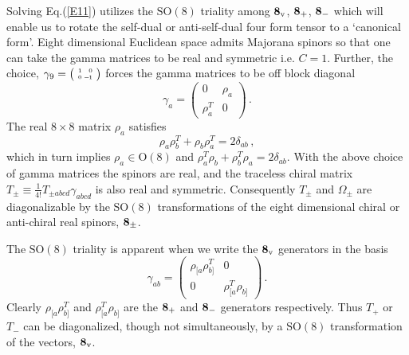 \documentclass[a4paper,11pt]{article}
\begin{document}
Solving Eq.(\ref{E11}) utilizes    the $\mbox{SO}(8)$ triality among   ${\bf 8}_{{\rm v}}$, ${\bf 8}_{+}$, ${\bf 8}_{-}$ which will enable us to
rotate the self-dual or anti-self-dual four form tensor to a `canonical form'.  Eight dimensional Euclidean space admits Majorana spinors so that one
can take the  gamma matrices to be real and symmetric i.e. $C=1$. Further, the choice, $\gamma_{9}={\big(\!{\tiny\begin{array}{l}
1\,\,\,\,\,0\\0-\!\!1\end{array}}\!\big)}$ forces the gamma matrices to be off block diagonal
\begin{equation}
\gamma_{a}=\left(\begin{array}{cc}0&\rho_{a}\\\rho_{a}^{T}&0\end{array}\right)\,.
\end{equation}
The real $8\times 8$ matrix $\rho_{a}$ satisfies
\begin{equation}
\rho_{a}\rho_{b}^{T}+\rho_{b}\rho_{a}^{T}=2\delta_{ab}\,,
\end{equation}
which in turn implies $\rho_{a}\!\in\!\mbox{O}(8)$ and  $\rho_{a}^{T}\rho_{b}+\rho_{b}^{T}\rho_{a}=2\delta_{ab}$. With the above choice of gamma
matrices the spinors are real, and  the traceless chiral matrix $T_{\pm}\equiv\frac{1}{4!}T_{\pm abcd}\gamma_{abcd}$  is   also real and symmetric.
Consequently $T_{\pm}$ and  $\Omega_{\pm}$  are diagonalizable by the $\mbox{SO}(8)$ transformations of the eight dimensional chiral or anti-chiral
real spinors, ${\bf 8}_{\pm}$.


The $\mbox{SO}(8)$ triality  is apparent when we  write  the ${\bf 8}_{{\rm v}}$ generators in the basis
\begin{equation}
\gamma_{ab}=\left(\begin{array}{cc}\rho_{[a}\rho_{b]}^{T}&0\\ 0&\rho_{[a}^{T}\rho_{b]}\end{array}\right)\,.
\label{triality}
\end{equation}
Clearly $\rho_{[a}\rho_{b]}^{T}$ and  $\rho_{[a}^{T}\rho_{b]}$ are the  ${\bf 8}_{+}$ and ${\bf 8}_{-}$ generators respectively.  Thus $T_{+}$ or
$T_{-}$  can be  diagonalized, though not simultaneously,  by a $\mbox{SO}(8)$ transformation  of the vectors, ${\bf  8}_{{\rm v}}$.
\end{document}
